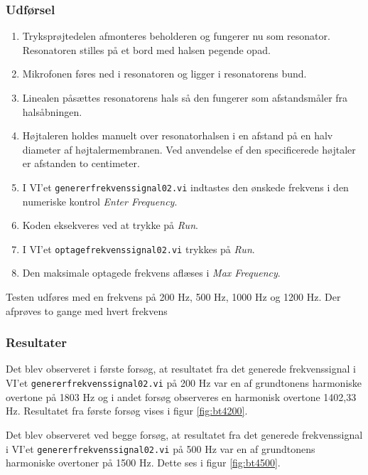 		
		\subsubsection{Udførsel}
			
			\begin{enumerate}
				\item Tryksprøjtedelen afmonteres beholderen og fungerer nu som resonator. Resonatoren stilles på et bord med halsen pegende opad. 
				\item Mikrofonen føres ned i resonatoren og ligger i resonatorens bund. 
				\item Linealen påsættes resonatorens hals så den fungerer som afstandsmåler fra halsåbningen.
				\item Højtaleren holdes manuelt over resonatorhalsen i en afstand på en halv diameter af højtalermembranen. Ved anvendelse ef den specificerede højtaler er afstanden to centimeter. 
				\item I VI'et \texttt{genererfrekvenssignal02.vi} indtastes den ønskede frekvens i den numeriske kontrol \textit{Enter Frequency}. 
					
						\item Koden eksekveres ved at trykke på \textit{Run}. 
					
				\item I VI'et \texttt{optagefrekvenssignal02.vi} trykkes på \textit{Run}. 
					
						\item Den maksimale optagede frekvens aflæses i \textit{Max Frequency}. 
					
			\end{enumerate}
			
			
			Testen udføres med en frekvens på 200 Hz, 500 Hz, 1000 Hz og 1200 Hz. Der afprøves to gange med hvert frekvens  
			
			\subsubsection{Resultater}
			
			 Det blev observeret i første forsøg, at resultatet fra det generede frekvenssignal i VI'et \texttt{genererfrekvenssignal02.vi} på 200 Hz var en af grundtonens harmoniske overtone på 1803 Hz og i andet forsøg observeres en harmonisk overtone 1402,33 Hz. Resultatet fra første forsøg vises i figur \ref{fig:bt4200}.
			 
			 Det blev observeret ved begge forsøg, at resultatet fra det generede frekvenssignal i VI'et \texttt{genererfrekvenssignal02.vi} på 500 Hz var en af grundtonens harmoniske overtoner på 1500 Hz. Dette ses i figur \ref{fig:bt4500}. 
			 
